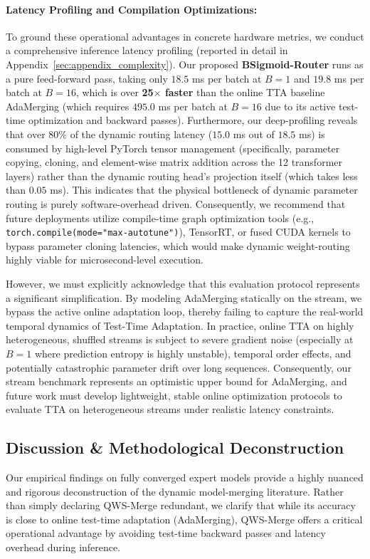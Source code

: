 \begin{enumerate}
    \paragraph{Latency Profiling and Compilation Optimizations:} To ground these operational advantages in concrete hardware metrics, we conduct a comprehensive inference latency profiling (reported in detail in Appendix~\ref{sec:appendix_complexity}). Our proposed \textbf{BSigmoid-Router} runs as a pure feed-forward pass, taking only $18.5$ ms per batch at $B=1$ and $19.8$ ms per batch at $B=16$, which is over \textbf{25$\times$ faster} than the online TTA baseline AdaMerging (which requires $495.0$ ms per batch at $B=16$ due to its active test-time optimization and backward passes). 
    Furthermore, our deep-profiling reveals that over $80\%$ of the dynamic routing latency ($15.0$ ms out of $18.5$ ms) is consumed by high-level PyTorch tensor management (specifically, parameter copying, cloning, and element-wise matrix addition across the 12 transformer layers) rather than the dynamic routing head's projection itself (which takes less than $0.05$ ms). This indicates that the physical bottleneck of dynamic parameter routing is purely software-overhead driven. Consequently, we recommend that future deployments utilize compile-time graph optimization tools (e.g., \texttt{torch.compile(mode="max-autotune")}), TensorRT, or fused CUDA kernels to bypass parameter cloning latencies, which would make dynamic weight-routing highly viable for microsecond-level execution.
    
    However, we must explicitly acknowledge that this evaluation protocol represents a significant simplification. By modeling AdaMerging statically on the stream, we bypass the active online adaptation loop, thereby failing to capture the real-world temporal dynamics of Test-Time Adaptation. In practice, online TTA on highly heterogeneous, shuffled streams is subject to severe gradient noise (especially at $B=1$ where prediction entropy is highly unstable), temporal order effects, and potentially catastrophic parameter drift over long sequences. Consequently, our stream benchmark represents an optimistic upper bound for AdaMerging, and future work must develop lightweight, stable online optimization protocols to evaluate TTA on heterogeneous streams under realistic latency constraints.
\end{enumerate}

\subsection{Discussion \& Methodological Deconstruction}
\label{sec:discussion}
Our empirical findings on fully converged expert models provide a highly nuanced and rigorous deconstruction of the dynamic model-merging literature. Rather than simply declaring QWS-Merge redundant, we clarify that while its accuracy is close to online test-time adaptation (AdaMerging), QWS-Merge offers a critical operational advantage by avoiding test-time backward passes and latency overhead during inference.

